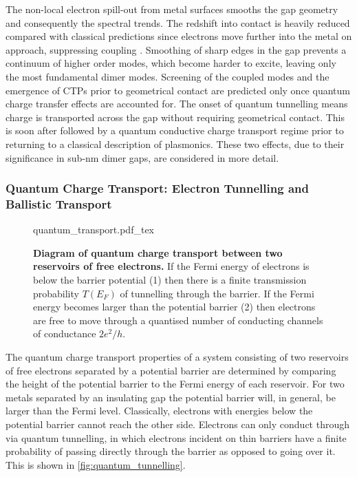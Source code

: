 \documentclass{article}
\begin{document}
The non-local electron spill-out from metal surfaces smooths the gap geometry and consequently the spectral trends. The redshift into contact is heavily reduced compared with classical predictions since electrons move further into the metal on approach, suppressing coupling \cite{esteban2015}. Smoothing of sharp edges in the gap prevents a continuum of higher order modes, which become harder to excite, leaving only the most fundamental dimer modes.
Screening of the coupled modes and the emergence of CTPs prior to geometrical contact are predicted only once quantum charge transfer effects are accounted for. The onset of quantum tunnelling means charge is transported across the gap without requiring geometrical contact. This is soon after followed by a quantum conductive charge transport regime prior to returning to a classical description of plasmonics. These two effects, due to their significance in sub-nm dimer gaps, are considered in more detail.

\FloatBarrier
\subsubsection{Quantum Charge Transport: Electron Tunnelling and Ballistic Transport}

\begin{figure}[bt]
\centering
\fontsize{10pt}{1em}\selectfont
\def\svgwidth{0.65\textwidth}
{quantum_transport.pdf_tex}
\caption[Diagram of quantum charge transport between two reservoirs of free electrons]{\textbf{Diagram of quantum charge transport between two reservoirs of free electrons.} If the Fermi energy of electrons is below the barrier potential (1) then there is a finite transmission probability $T(E_F)$ of tunnelling through the barrier. If the Fermi energy becomes larger than the potential barrier (2) then electrons are free to move through a quantised number of conducting channels of conductance $2e^2/h$.}
\label{fig:quantum_tunnelling}
\vspace{-10pt}
\end{figure}

The quantum charge transport properties of a system consisting of two reservoirs of free electrons separated by a potential barrier are determined by comparing the height of the potential barrier to the Fermi energy of each reservoir. For two metals separated by an insulating gap the potential barrier will, in general, be larger than the Fermi level. Classically, electrons with energies below the potential barrier cannot reach the other side. Electrons can only conduct through via quantum tunnelling, in which electrons incident on thin barriers have a finite probability of passing directly through the barrier as opposed to going over it. This is shown in \autoref{fig:quantum_tunnelling}.
\end{document}
